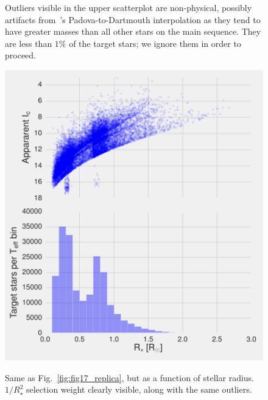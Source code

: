 \begin{figure}[!tb]
{		Outliers visible in the upper scatterplot are non-physical,
		possibly artifacts from~'s
		Padova-to-Dartmouth interpolation as they tend to have greater
		masses than all other stars on the main sequence. They are
		less than $1\%$ of the target stars; we ignore them in order
		to proceed.
	}
\end{figure}
\begin{figure}[!tb]
	\includegraphics{figures/fig17_radius_on_x.pdf}
	\label{fig:fig17_radius_on_x}
	\caption{Same as Fig.~\protect\ref{fig:fig17_replica}, but as a function of stellar radius. $1/R_\star^2$ selection weight clearly visible, along with the same outliers.
	}
\end{figure}


